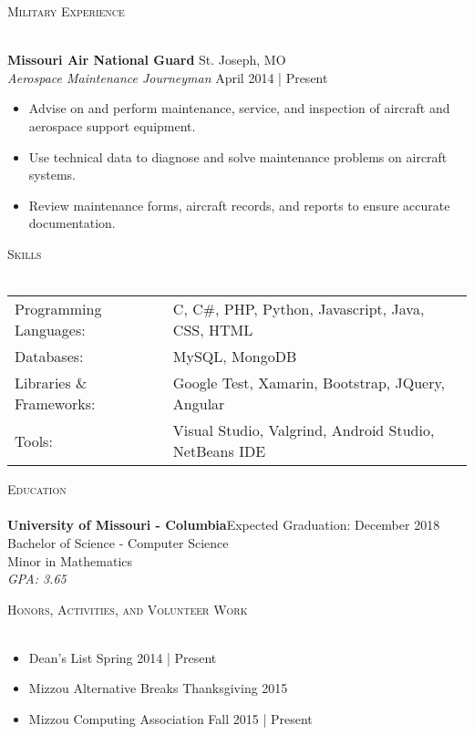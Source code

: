 \documentclass[a4paper]{article}
\newcommand{\lineunder} {
    \vspace*{-8pt} \\
    \hspace*{-18pt} \hrulefill \\
}
\newcommand{\header} [1] {
    {\hspace*{-18pt}\vspace*{6pt} \textsc{#1}}
    \vspace*{-6pt} \lineunder
}
\begin{document}
\header{Military Experience}
\vspace{1mm}

\textbf{Missouri Air National Guard} \hfill St. Joseph, MO\\
\textit{Aerospace Maintenance Journeyman} \hfill April 2014 | Present\\
\vspace{-1mm}
\begin{itemize} \itemsep 1pt
	\item Advise on and perform maintenance, service, and inspection of aircraft and aerospace support equipment.
	\item Use technical data to diagnose and solve maintenance problems on aircraft systems.
	\item Review maintenance forms, aircraft records, and reports to ensure accurate documentation.
\end{itemize}

\header{Skills}
\vspace{1mm}
\begin{tabular}{ l l }
	Programming Languages:   & C, C\#, PHP, Python, Javascript, Java, CSS, HTML      \\
	Databases:               & MySQL, MongoDB                                        \\
	Libraries \& Frameworks: & Google Test, Xamarin, Bootstrap, JQuery, Angular      \\
	Tools:                   & Visual Studio, Valgrind, Android Studio, NetBeans IDE \\
\end{tabular}
\vspace{2mm}

\header{Education}
\textbf{University of Missouri - Columbia}\hfill Expected Graduation: December 2018\\
Bachelor of Science - Computer Science \hfill \\
Minor in Mathematics\\
\textit{GPA: 3.65}\\
 
\vspace{2mm}


\header{Honors, Activities, and Volunteer Work}
\vspace{-1mm}
\begin{itemize} \itemsep 1pt
	\item Dean’s List \hfill Spring 2014 | Present
	\item Mizzou Alternative Breaks \hfill Thanksgiving 2015
	\item Mizzou Computing Association \hfill Fall 2015 | Present
\end{itemize}

\ 
\end{document}
